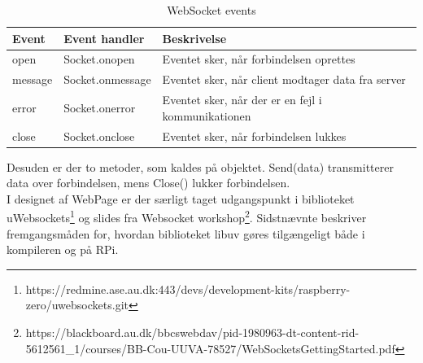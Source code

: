 \documentclass[Softwaredesign/Softwaredesign_main.tex]{subfiles}
\begin{document}
\begin{table}[H]
\centering
\begin{tabular}{|L{0.15\textwidth}|L{0.25\textwidth}|L{0.3\textwidth}|}
\hline
\textbf{Event} & \textbf{Event handler} & \textbf{Beskrivelse} \\ \hline
open & Socket.onopen & Eventet sker, når forbindelsen oprettes \\ \hline
message & Socket.onmessage & Eventet sker, når client modtager data fra server \\ \hline
error & Socket.onerror & Eventet sker, når der er en fejl i kommunikationen \\ \hline
close & Socket.onclose & Eventet sker, når forbindelsen lukkes \\ \hline
\end{tabular}
\caption{WebSocket events}
\label{tab:websocket_events}
\end{table}
Desuden er der to metoder, som kaldes på objektet. Send(data) transmitterer data over forbindelsen, mens Close() lukker forbindelsen.
\\I designet af WebPage er der særligt taget udgangspunkt i biblioteket uWebsockets\footnote{https://redmine.ase.au.dk:443/devs/development-kits/raspberry-zero/uwebsockets.git} og slides fra Websocket workshop\footnote{https://blackboard.au.dk/bbcswebdav/pid-1980963-dt-content-rid-5612561_1/courses/BB-Cou-UUVA-78527/WebSocketsGettingStarted.pdf}. Sidstnævnte beskriver fremgangsmåden for, hvordan biblioteket libuv gøres tilgængeligt både i kompileren og på RPi.
\end{document}
